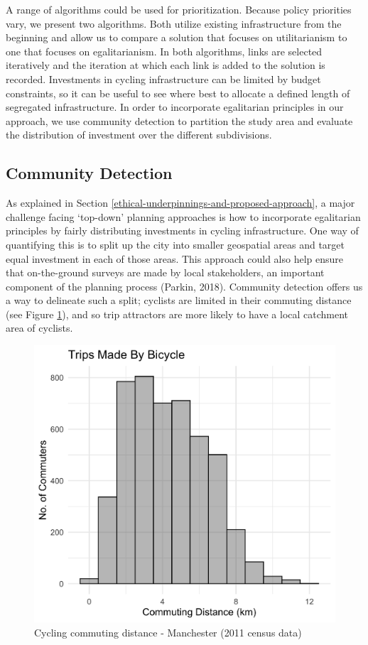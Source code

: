 \documentclass[
]{article}
\begin{document}
A range of algorithms could be used for prioritization. Because policy
priorities vary, we present two algorithms. Both utilize existing
infrastructure from the beginning and allow us to compare a solution
that focuses on utilitarianism to one that focuses on egalitarianism. In
both algorithms, links are selected iteratively and the iteration at
which each link is added to the solution is recorded. Investments in
cycling infrastructure can be limited by budget constraints, so it can
be useful to see where best to allocate a defined length of segregated
infrastructure. In order to incorporate egalitarian principles in our
approach, we use community detection to partition the study area and
evaluate the distribution of investment over the different subdivisions.

\hypertarget{community-detection}{%
\subsection{Community Detection}\label{community-detection}}

As explained in Section
\ref{ethical-underpinnings-and-proposed-approach}, a major challenge
facing `top-down' planning approaches is how to incorporate egalitarian
principles by fairly distributing investments in cycling infrastructure.
One way of quantifying this is to split up the city into smaller
geospatial areas and target equal investment in each of those areas.
This approach could also help ensure that on-the-ground surveys are made
by local stakeholders, an important component of the planning process
(Parkin, 2018). Community detection offers us a way to
delineate such a split; cyclists are limited in their commuting distance
(see Figure \ref{fig:cyclinghistmanc}), and so trip attractors are more
likely to have a local catchment area of cyclists.

\begin{figure}

{\centering \includegraphics[width=0.4\linewidth]{data/Manchester/Plots/histogram_distance_cycling} 

}

\caption{Cycling commuting distance - Manchester (2011 census data)}\label{fig:cyclinghistmanc}
\end{figure}
\end{document}
